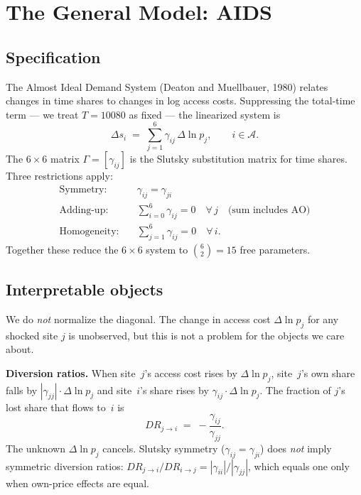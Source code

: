 \documentclass{article}
\begin{document}
\bigskip

\section{The General Model: AIDS}

\subsection{Specification}

The Almost Ideal Demand System (Deaton and Muellbauer, 1980) relates changes in
time shares to changes in log access costs.  Suppressing the total-time term
--- we treat $T = 10080$ as fixed --- the linearized system is
\begin{equation}\label{eq:aids}
  \Delta s_i \;=\; \sum_{j=1}^{6} \gamma_{ij}\, \Delta \ln p_j,
  \qquad i \in \mathcal{A}.
\end{equation}
The $6 \times 6$ matrix $\Gamma = [\gamma_{ij}]$ is the Slutsky substitution
matrix for time shares.  Three restrictions apply:
\begin{align*}
  \text{Symmetry:}&\quad \gamma_{ij} = \gamma_{ji} \\
  \text{Adding-up:}&\quad \sum_{i=0}^{6} \gamma_{ij} = 0 \quad\forall\, j
    \quad\text{(sum includes AO)} \\
  \text{Homogeneity:}&\quad \sum_{j=1}^{6} \gamma_{ij} = 0 \quad\forall\, i.
\end{align*}
Together these reduce the $6 \times 6$ system to $\binom{6}{2} = 15$ free
parameters.

\subsection{Interpretable objects}

We do \emph{not} normalize the diagonal.  The change in access cost $\Delta\ln
p_j$ for any shocked site $j$ is unobserved, but this is not a problem for
the objects we care about.

\medskip\noindent\textbf{Diversion ratios.}  When site~$j$'s access cost
rises by $\Delta\ln p_j$, site~$j$'s own share falls by $|\gamma_{jj}|
\cdot \Delta\ln p_j$ and site~$i$'s share rises by $\gamma_{ij} \cdot \Delta
\ln p_j$.  The fraction of $j$'s lost share that flows to~$i$ is
\begin{equation}\label{eq:dr}
  DR_{j \to i} \;=\; -\frac{\gamma_{ij}}{\gamma_{jj}}.
\end{equation}
The unknown $\Delta\ln p_j$ cancels.  Slutsky symmetry ($\gamma_{ij} =
\gamma_{ji}$) does \emph{not} imply symmetric diversion ratios:
$DR_{j \to i}/DR_{i \to j} = |\gamma_{ii}|/|\gamma_{jj}|$, which equals one
only when own-price effects are equal.
\end{document}
